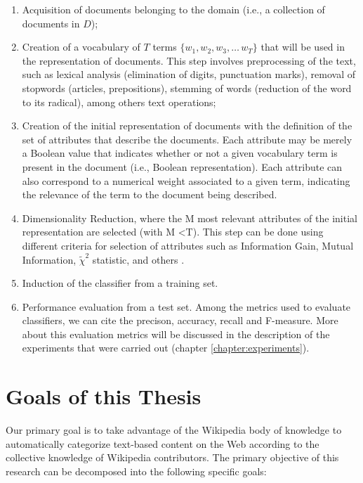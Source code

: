\begin{enumerate}
\item  Acquisition of documents belonging to the domain (i.e.,
a collection of documents in $D$);
\item Creation of a vocabulary of $T$ terms  $\{w_1,w_2,w_3,\ldots\,w_T\}$ that will be used in the representation of documents. This step involves preprocessing of the text, such as lexical analysis (elimination of digits, punctuation marks), removal of stopwords (articles, prepositions), stemming of words (reduction of the word to its radical), among others text operations;

\item Creation of the initial representation of documents with the definition of the set of attributes that describe the documents. Each attribute may be merely a Boolean value that indicates whether or not a given vocabulary term is present in the document (i.e., Boolean representation).  Each attribute can also correspond to a numerical weight associated to a given term, indicating the relevance of the term to the document being described. 

\item Dimensionality Reduction, where the M most relevant attributes of the initial representation are selected (with M <T). This step can be done using different criteria for selection of attributes such as Information Gain, Mutual Information, $\tilde{\chi}^2$ statistic, and others \cite{Yang:1997}.

\item Induction of the classifier from a training set. %

\item Performance evaluation from a test set. Among the metrics used to evaluate classifiers, we can cite the precison, accuracy,  recall and F-measure. More about this evaluation metrics will be discussed in the description of the experiments that were carried out (chapter \ref{chapter:experiments}).

\end{enumerate}


\section{\hspace*{3pt}Goals of this Thesis}

Our primary goal is to take advantage of the Wikipedia body of knowledge to automatically categorize text-based content on the Web according to the collective knowledge of Wikipedia contributors.
The primary objective of this research can be decomposed into the following specific goals:



